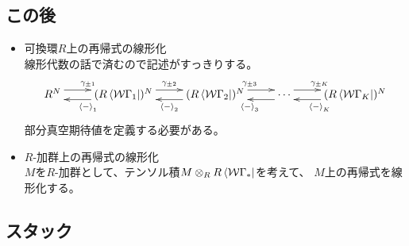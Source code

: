 {\subsection{この後}\label{s2:この後} %
	\begin{itemize}\setlength{\itemsep}{-1mm} %
		\item 可換環$R$上の再帰式の線形化 \\
		線形代数の話で済むので記述がすっきりする。
		\begin{equation*}\xymatrix{
			R^N \ar@<1ex>[r]^{\gamma_{\pm1}} 
			& (R\bra{\W\Gamma_1})^N \ar@<1ex>[r]^{\gamma_{\pm2}}
				\ar@<1ex>[l]^{\braket{-}_1}
			& (R\bra{\W\Gamma_2})^N \ar@<1ex>[r]^{\gamma_{\pm3}}
				\ar@<1ex>[l]^{\braket{-}_2}
			& \cdots \ar@<1ex>[r]^{\gamma_{\pm K}}
				\ar@<1ex>[l]^{\braket{-}_3}
			& (R\bra{\W\Gamma_K})^N \ar@<1ex>[l]^{\braket{-}_K}
		}\end{equation*}
		部分真空期待値を定義する必要がある。
		\item $R$-加群上の再帰式の線形化 \\
		$M$を$R$-加群として、テンソル積$M\otimes_RR\mathinner{\langle{{\ensuremath{{\mathcal{W}}}}\Gamma_*}|}$を考えて、
		$M$上の再帰式を線形化する。
	\end{itemize} %
\subsection{スタック}\label{s2:スタック} %
}
